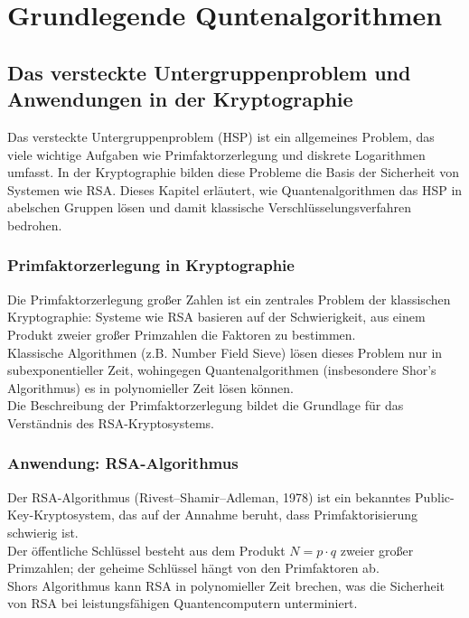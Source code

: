 \chapter{Grundlegende Quntenalgorithmen}
\label{basic_algorithms} %




\section{Das versteckte Untergruppenproblem und Anwendungen in der Kryptographie}
Das versteckte Untergruppenproblem (HSP) ist ein allgemeines Problem, das viele wichtige Aufgaben wie Primfaktorzerlegung und diskrete Logarithmen umfasst. In der Kryptographie bilden diese Probleme die Basis der Sicherheit von Systemen wie RSA. Dieses Kapitel erläutert, wie Quantenalgorithmen das HSP in abelschen Gruppen lösen und damit klassische Verschlüsselungsverfahren bedrohen.

\subsection{Primfaktorzerlegung in Kryptographie}

Die Primfaktorzerlegung großer Zahlen ist ein zentrales Problem der klassischen Kryptographie: Systeme wie RSA basieren auf der Schwierigkeit, aus einem Produkt zweier großer Primzahlen die Faktoren zu bestimmen. \\
Klassische Algorithmen (z.B. Number Field Sieve) lösen dieses Problem nur in subexponentieller Zeit, wohingegen Quantenalgorithmen (insbesondere Shor’s Algorithmus) es in polynomieller Zeit lösen können.\\
Die Beschreibung der Primfaktorzerlegung bildet die Grundlage für das Verständnis des RSA-Kryptosystems.

\subsection{Anwendung: RSA-Algorithmus}

Der RSA-Algorithmus (Rivest–Shamir–Adleman, 1978) ist ein bekanntes Public-Key-Kryptosystem, das auf der Annahme beruht, dass Primfaktorisierung schwierig ist.\\
Der öffentliche Schlüssel besteht aus dem Produkt $N = p \cdot q$ zweier großer Primzahlen; der geheime Schlüssel hängt von den Primfaktoren ab.\\
Shors Algorithmus kann RSA in polynomieller Zeit brechen, was die Sicherheit von RSA bei leistungsfähigen Quantencomputern unterminiert.

